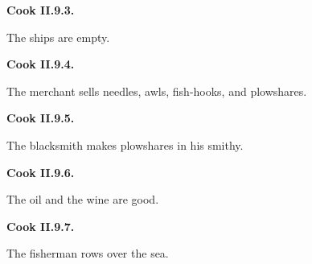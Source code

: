 \par\begin{minipage}{\linewidth}\raggedright
\textbf{Cook II.9.3.}

The ships are empty.

\end{minipage}\par\addvspace{4pt}

\par\begin{minipage}{\linewidth}\raggedright
\textbf{Cook II.9.4.}

The merchant sells needles, awls, fish-hooks, and plowshares.

\end{minipage}\par\addvspace{4pt}

\par\begin{minipage}{\linewidth}\raggedright
\textbf{Cook II.9.5.}

The blacksmith makes plowshares in his smithy.

\end{minipage}\par\addvspace{4pt}

\par\begin{minipage}{\linewidth}\raggedright
\textbf{Cook II.9.6.}

The oil and the wine are good.

\end{minipage}\par\addvspace{4pt}

\par\begin{minipage}{\linewidth}\raggedright
\textbf{Cook II.9.7.}

The fisherman rows over the sea.

\end{minipage}\par\addvspace{4pt}

